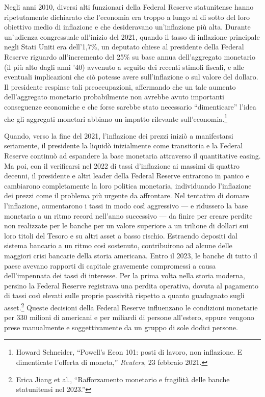 \documentclass[
  a5paper,
  smalldemyvopaper,10pt,twoside,onecolumn,openright,extrafontsizes,hidelinks]{memoir}
\begin{document}
Negli anni 2010, diversi alti funzionari della Federal Reserve
statunitense hanno ripetutamente dichiarato che l'economia era troppo a
lungo al di sotto del loro obiettivo medio di inflazione e che
desideravano un'inflazione più alta. Durante un'udienza congressuale
all'inizio del 2021, quando il tasso di inflazione principale negli
Stati Uniti era dell'1,7\%, un deputato chiese al presidente della
Federal Reserve riguardo all'incremento del 25\% su base annua
dell'aggregato monetario (il più alto dagli anni '40) avvenuto a seguito
dei recenti stimoli fiscali, e alle eventuali implicazioni che ciò
potesse avere sull'inflazione o sul valore del dollaro. Il presidente
respinse tali preoccupazioni, affermando che un tale aumento
dell'aggregato monetario probabilmente non avrebbe avuto importanti
conseguenze economiche e che forse sarebbe stato necessario
``dimenticare'' l'idea che gli aggregati monetari abbiano un impatto
rilevante sull'economia.\footnote{Howard Schneider, ``Powell's Econ 101:
  posti di lavoro, non inflazione. E dimenticate l'offerta di moneta,''
  \emph{Reuters}, 23 febbraio 2021.}

Quando, verso la fine del 2021, l'inflazione dei prezzi iniziò a
manifestarsi seriamente, il presidente la liquidò inizialmente come
transitoria e la Federal Reserve continuò ad espandere la base monetaria
attraverso il quantitative easing. Ma poi, con il verificarsi nel 2022
di tassi d'inflazione ai massimi di quattro decenni, il presidente e
altri leader della Federal Reserve entrarono in panico e cambiarono
completamente la loro politica monetaria, individuando l'inflazione dei
prezzi come il problema più urgente da affrontare. Nel tentativo di
domare l'inflazione, aumentarono i tassi in modo così aggressivo --- e
ridussero la base monetaria a un ritmo record nell'anno successivo ---
da finire per creare perdite non realizzate per le banche per un valore
superiore a un trilione di dollari sui loro titoli del Tesoro e su altri
asset a basso rischio. Estraendo depositi dal sistema bancario a un
ritmo così sostenuto, contribuirono ad alcune delle maggiori crisi
bancarie della storia americana. Entro il 2023, le banche di tutto il
paese avevano rapporti di capitale gravemente compromessi a causa
dell'impennata dei tassi di interesse. Per la prima volta nella storia
moderna, persino la Federal Reserve registrava una perdita operativa,
dovuta al pagamento di tassi così elevati sulle proprie passività
rispetto a quanto guadagnato sugli asset.\footnote{Erica Jiang et al.,
  ``Rafforzamento monetario e fragilità delle banche statunitensi nel
  2023.''} Queste decisioni della Federal Reserve influenzano le
condizioni monetarie per 330 milioni di americani e per miliardi di
persone all'estero, eppure vengono prese manualmente e soggettivamente
da un gruppo di sole dodici persone.
\end{document}
